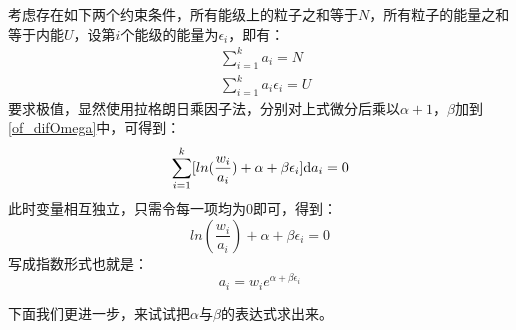 \documentclass{Physics_H_Notes}
\begin{document}
\begin{prove}
\begin{equation}
                \label{of_difOmega}
            \end{equation}
            考虑存在如下两个约束条件，所有能级上的粒子之和等于$N$，所有粒子的能量之和等于内能$U$，设第$i$个能级的能量为$\epsilon_i$，即有：
            \begin{equation}
                \begin{aligned}
                    &\sum_{i=1}^{k}a_i = N\\
                    &\sum_{i=1}^{k}a_i \epsilon_i = U
                    \label{of_U}
                \end{aligned}
            \end{equation}
            要求极值，显然使用拉格朗日乘因子法，分别对上式微分后乘以$\alpha + 1$，$\beta$加到\ref{of_difOmega}中，可得到：
            \begin{equation}
                \sum_{i=1}^{k} [ln(\frac{w_i}{a_i})+\alpha+\beta \epsilon_i] \mathrm{d}{a_i} = 0
            \end{equation}
            此时变量相互独立，只需令每一项均为0即可，得到：
            \begin{equation}
                ln(\frac{w_i}{a_i})+\alpha+\beta \epsilon_i = 0
                \label{of_a_i}
            \end{equation}
            写成指数形式也就是：
            \begin{equation}
                a_i = w_i e^{\alpha + \beta \epsilon_i}
                \label{of_a_i_2}
            \end{equation}

            下面我们更进一步，来试试把$\alpha$与$\beta$的表达式求出来。


\end{prove}
\end{document}
